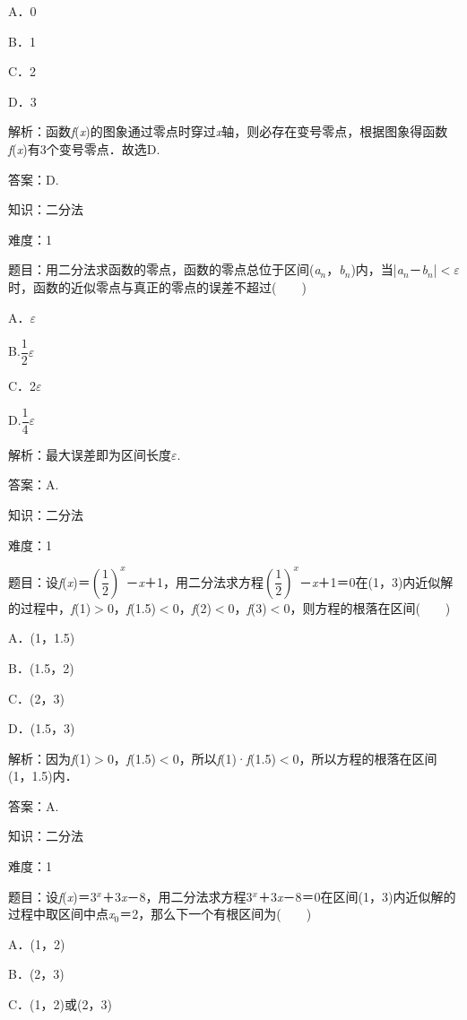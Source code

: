 \documentclass{article} %
\begin{document}
A．0　　　　　

B．1　　　　 

C．2　　　　　

D．3

解析：函数\textit{f}(\textit{x})的图象通过零点时穿过\textit{x}轴，则必存在变号零点，根据图象得函数\textit{f}(\textit{x})有3个变号零点．故选D.

答案：D.

知识：二分法

难度：1

题目：用二分法求函数的零点，函数的零点总位于区间(\textit{a${}_{n}$}，\textit{b${}_{n}$})内，当|\textit{a${}_{n}$}－\textit{b${}_{n}$}|$\mathrm{<}$\textit{$\varepsilon$}时，函数的近似零点与真正的零点的误差不超过(　　)

A．\textit{$\varepsilon$}   

B.$\dfrac{1}{2}$\textit{$\varepsilon$}

C．2\textit{$\varepsilon$}   

D.$\dfrac{1}{4}$\textit{$\varepsilon$}

解析：最大误差即为区间长度\textit{$\varepsilon$}.

答案：A.

知识：二分法

难度：1

题目：设\textit{f}(\textit{x})＝$(\dfrac{1}{2})^{x}$－\textit{x}＋1，用二分法求方程$(\dfrac{1}{2})^{x}$－\textit{x}＋1＝0在(1，3)内近似解的过程中，\textit{f}(1)$\mathrm{>}$0，\textit{f}(1.5)$\mathrm{<}$0，\textit{f}(2)$\mathrm{<}$0，\textit{f}(3)$\mathrm{<}$0，则方程的根落在区间(　　)

A．(1，1.5)   

B．(1.5，2)

C．(2，3)   

D．(1.5，3)

解析：因为\textit{f}(1)$\mathrm{>}$0，\textit{f}(1.5)$\mathrm{<}$0，所以\textit{f}(1)·\textit{f}(1.5)$\mathrm{<}$0，所以方程的根落在区间(1，1.5)内．

答案：A.

知识：二分法

难度：1

题目：设\textit{f}(\textit{x})＝3\textit{${}^{x}$}＋3\textit{x}－8，用二分法求方程3\textit{${}^{x}$}＋3\textit{x}－8＝0在区间(1，3)内近似解的过程中取区间中点\textit{x}${}_{0}$＝2，那么下一个有根区间为(　　)

A．(1，2)   

B．(2，3)

C．(1，2)或(2，3)   
\end{document}
